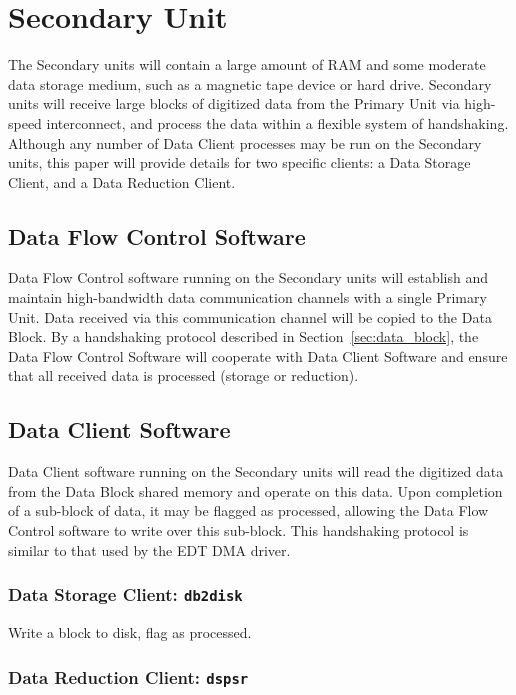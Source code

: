 \chapter{Secondary Unit}

The Secondary units will contain a large amount of RAM and some
moderate data storage medium, such as a magnetic tape device or hard
drive.  Secondary units will receive large blocks of digitized data
from the Primary Unit via high-speed interconnect, and process the
data within a flexible system of handshaking.  Although any number of
Data Client processes may be run on the Secondary units, this paper
will provide details for two specific clients: a Data Storage Client,
and a Data Reduction Client.

\section{Data Flow Control Software}

Data Flow Control software running on the Secondary units will
establish and maintain high-bandwidth data communication channels with
a single Primary Unit.  Data received via this communication channel
will be copied to the Data Block.  By a handshaking protocol described
in Section~\ref{sec:data_block}, the Data Flow Control Software will
cooperate with Data Client Software and ensure that all received data
is processed (storage or reduction).

\section{Data Client Software}

Data Client software running on the Secondary units will read the
digitized data from the Data Block shared memory and operate on this
data.  Upon completion of a sub-block of data, it may be flagged as
processed, allowing the Data Flow Control software to write over this
sub-block.  This handshaking protocol is similar to that used by the
EDT DMA driver.

\subsection{Data Storage Client: {\tt db2disk}}

Write a block to disk, flag as processed.

\subsection{Data Reduction Client: {\tt dspsr}}

